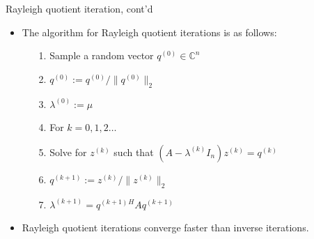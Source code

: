 \documentclass[t,usepdftitle=false]{beamer}
\begin{document}
\begin{frame}{Rayleigh quotient iteration, cont'd}
\begin{itemize}
\item The algorithm for Rayleigh quotient iterations is as follows:\vspace{.1cm}
\begin{itemize}\normalsize
\item[1.] Sample a random vector $q^{(0)}\in\mathbb{C}^n$\vspace{.07cm}
\item[2.]$q^{(0)}:=q^{(0)}/\|q^{(0)}\|_2$\vspace{.07cm}
\item[3.] $\lambda^{(0)}:=\mu$\vspace{.07cm}
\item[4.]For $k=0,1,2\dots$\vspace{.07cm}
\item[5.]\hspace{.4cm}Solve for $z^{(k)}$ such that $(A-\lambda^{(k)} I_n)z^{(k)}=q^{(k)}$\vspace{.07cm}
\item[6.]\hspace{.4cm}$q^{(k+1)}:=z^{(k)}/\|z^{(k)}\|_2$\vspace{.07cm}
\item[7.]\hspace{.4cm}$\lambda^{(k+1)}=q^{(k+1)}{}^HAq^{(k+1)}$\vspace{.2cm}
\end{itemize}
\item Rayleigh quotient iterations converge faster than inverse iterations.

\end{itemize}
\end{frame}
\end{document}
